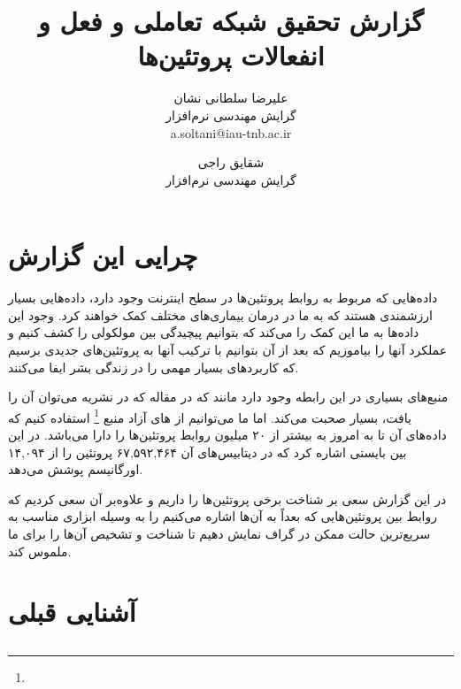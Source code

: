 \documentclass[10pt, a4paper]{article}
\title{گزارش تحقیق شبکه تعاملی و فعل و انفعالات پروتئین‌ها}
\author{
    علیرضا سلطانی نشان \\
    گرایش مهندسی نرم‌افزار \\
    a.soltani@iau-tnb.ac.ir
  \and
    شقایق راجی \\
    گرایش مهندسی نرم‌افزار \\
}
\begin{document}
\maketitle

\section*{چرایی این گزارش}

داده‌هایی که مربوط به روابط پروتئین‌ها در سطح اینترنت وجود دارد، داده‌هایی بسیار
ارزشمندی هستند که به ما در درمان بیماری‌های مختلف کمک خواهند کرد. وجود این
داده‌ها به ما این کمک را می‌کند که بتوانیم پیچیدگی بین مولکولی را کشف کنیم و
عملکرد آنها را بیاموزیم که بعد از آن بتوانیم با ترکیب آنها به پروتئین‌های جدیدی
برسیم که کاربرد‌های بسیار مهمی را در زندگی بشر ایفا می‌کنند.

منبع‌های بسیاری در این رابطه وجود دارد مانند  \cite{konc2022protein}
که در مقاله  که در نشریه 
می‌توان آن را یافت، بسیار صحبت می‌کند. اما ما می‌توانیم از های آزاد منبع
 \footnote{  } استفاده کنیم که داده‌های آن تا به امروز به بیشتر
از ۲۰ میلیون روابط پروتئین‌ها را دارا می‌باشد. در این بین بایستی اشاره کرد که در
دیتابیس‌های آن ۶۷,۵۹۲,۴۶۴ پروتئین را از ۱۴,۰۹۴ اورگانیسم پوشش می‌دهد.

در این گزارش سعی بر شناخت برخی پروتئین‌ها را داریم و علاوه‌بر آن سعی کردیم که
روابط بین پروتئین‌هایی که بعداً به آن‌ها اشاره‌ می‌کنیم را به وسیله ابزاری مناسب
به سریع‌ترین حالت ممکن در گراف نمایش دهیم تا شناخت و تشخیص آن‌ها را برای ما
ملموس کند.

\newpage
\tableofcontents
\newpage

\section{آشنایی قبلی}

\subsection{}
\end{document}
